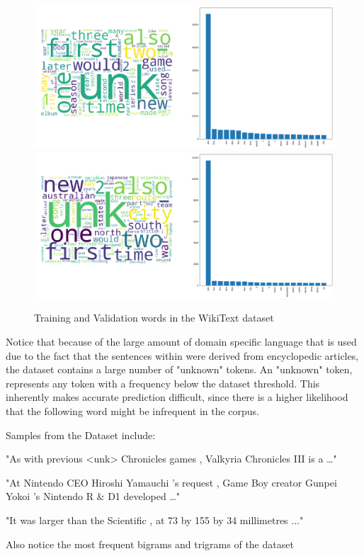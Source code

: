 \documentclass[a4paper]{article}
\begin{document}
\begin{figure}[!ht]
\includegraphics[width=0.8\columnwidth]{sr-eda-wikitext-train-words}
\includegraphics[width=0.8\columnwidth]{sr-eda-wikitext-valid-words}
\centering
\caption{Training and Validation words in the WikiText dataset}
\end{figure}

Notice that because of the large amount of domain specific language that is used
due to the fact that the sentences within were derived from encyclopedic
articles, the dataset contains a large number of "unknown" tokens. An "unknown"
token, represents any token with a frequency below the dataset threshold. This
inherently makes accurate prediction difficult, since there is a higher
likelihood that the following word might be infrequent in the corpus.

Samples from the Dataset include:

"As with previous <unk> Chronicles games , Valkyria Chronicles III is a …"

"At Nintendo CEO Hiroshi Yamauchi 's request , Game Boy creator Gunpei Yokoi 's Nintendo R \& D1 developed …"

"It was larger than the Scientific , at 73 by 155 by 34 millimetres ..."

Also notice the most frequent bigrams and trigrams of the dataset
\end{document}

